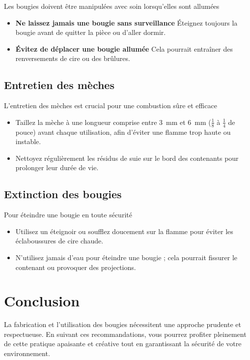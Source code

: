\documentclass[11pt,fleqn,onecolumn,oneside]{book}
\begin{document}
Les bougies doivent être manipulées avec soin lorsqu’elles sont allumées
\begin{itemize}
    \item \textbf{Ne laissez jamais une bougie sans surveillance} Éteignez toujours la bougie avant de quitter la pièce ou d’aller dormir.
    \item \textbf{Évitez de déplacer une bougie allumée} Cela pourrait entraîner des renversements de cire ou des brûlures.
\end{itemize}

\subsection*{Entretien des mèches}

L’entretien des mèches est crucial pour une combustion sûre et efficace
\begin{itemize}
    \item Taillez la mèche à une longueur comprise entre \SI{3}{\milli\meter} et \SI{6}{\milli\meter} (\(\frac{1}{8}\) à \(\frac{1}{4}\) de pouce) avant chaque utilisation, afin d’éviter une flamme trop haute ou instable.
    
    \item Nettoyez régulièrement les résidus de suie sur le bord des contenants pour prolonger leur durée de vie.
\end{itemize}

\subsection*{Extinction des bougies}

Pour éteindre une bougie en toute sécurité
\begin{itemize}
    \item Utilisez un éteignoir ou soufflez doucement sur la flamme pour éviter les éclaboussures de cire chaude.
    \item N’utilisez jamais d’eau pour éteindre une bougie ; cela pourrait fissurer le contenant ou provoquer des projections.
\end{itemize}

\section{Conclusion}

\begin{remark}
La fabrication et l’utilisation des bougies nécessitent une approche prudente et respectueuse. En suivant ces recommandations, vous pourrez profiter pleinement de cette pratique apaisante et créative tout en garantissant la sécurité de votre environnement.
\end{remark}
\end{document}
